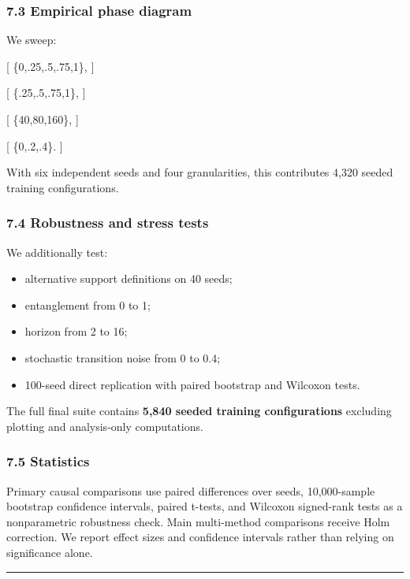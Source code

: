 \documentclass[
]{article}
\providecommand{\tightlist}{%
  \setlength{\itemsep}{0pt}\setlength{\parskip}{0pt}}
\begin{document}
\subsubsection{7.3 Empirical phase
diagram}\label{empirical-phase-diagram}

We sweep:

{[} \in\{0,.25,.5,.75,1\}, {]}

{[} \in\{.25,.5,.75,1\}, {]}

{[} \in\{40,80,160\}, {]}

{[} \in\{0,.2,.4\}. {]}

With six independent seeds and four granularities, this contributes
4,320 seeded training configurations.

\subsubsection{7.4 Robustness and stress
tests}\label{robustness-and-stress-tests}

We additionally test:

\begin{itemize}
\tightlist
\item
  alternative support definitions on 40 seeds;
\item
  entanglement from 0 to 1;
\item
  horizon from 2 to 16;
\item
  stochastic transition noise from 0 to 0.4;
\item
  100-seed direct replication with paired bootstrap and Wilcoxon tests.
\end{itemize}

The full final suite contains \textbf{5,840 seeded training
configurations} excluding plotting and analysis-only computations.

\subsubsection{7.5 Statistics}\label{statistics}

Primary causal comparisons use paired differences over seeds,
10,000-sample bootstrap confidence intervals, paired t-tests, and
Wilcoxon signed-rank tests as a nonparametric robustness check. Main
multi-method comparisons receive Holm correction. We report effect sizes
and confidence intervals rather than relying on significance alone.

\begin{center}\rule{0.5\linewidth}{0.5pt}\end{center}
\end{document}
